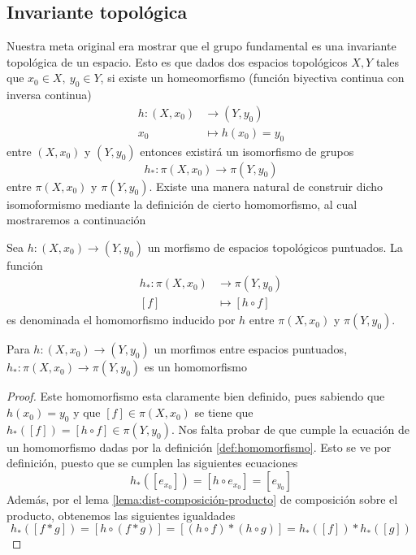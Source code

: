 {\subsection{Invariante topológica}
Nuestra meta original era mostrar que el grupo fundamental es una
invariante topológica de un espacio. Esto es que dados dos
espacios topológicos \(X,Y\) tales que \(x_0 \in X,\ y_0 \in Y\), si
existe un homeomorfismo (función biyectiva continua con inversa
continua)
\begin{align*}
  h : (X, x_0) &\longrightarrow (Y, y_0) \\
  x_0 &\longmapsto h(x_0) = y_0
\end{align*}
entre \((X, x_0)\) y \((Y, y_0)\) entonces existirá un isomorfismo de
grupos
\[ h_{*} : \pi (X, x_0) \longrightarrow \pi (Y, y_0) \]
entre \(\pi (X, x_0)\) y \(\pi (Y, y_0)\). Existe una manera natural de
construir dicho isomoformismo mediante la definición de cierto
homomorfismo, al cual mostraremos a continuación
\begin{definicion} \label{def:homomorfismo-inducido}
  Sea \(h : (X, x_0) \longrightarrow (Y, y_0)\) un morfismo de
  espacios topológicos puntuados. La función
  \begin{align*}
    h_* : \pi (X, x_0) &\longrightarrow \pi (Y, y_0) \\
    [f] &\longmapsto [h \circ f]
  \end{align*}
  es denominada el homomorfismo inducido por \(h\) entre \(\pi (X,
  x_0)\) y \(\pi (Y, y_0)\).
\end{definicion}
\begin{teorema} \label{thm:morfismo-homomorfismo}
  Para \(h : (X, x_0) \to (Y, y_0)\) un morfimos entre espacios
  puntuados, \(h_* : \pi (X, x_0) \to \pi (Y, y_0)\) es un homomorfismo
\end{teorema}
\begin{proof}
  Este homomorfismo esta claramente bien definido, pues sabiendo que \(h
  (x_0) = y_0\) y que \([f] \in \pi (X, x_0)\) se tiene que \(h_* ([f]) =
  [h \circ f] \in \pi (Y, y_0)\). Nos falta probar de que cumple la
  ecuación de un homomorfismo dadas por la definición
  \ref{def:homomorfismo}. Esto se ve por definición, puesto que se cumplen
  las siguientes ecuaciones
  \[ h_{*} ([e_{x_0}]) = [h \circ e_{x_0}] = [e_{y_0}]\]
  Además, por el lema \ref{lema:dist-composición-producto} de composición
  sobre el producto, obtenemos las siguientes igualdades
  \[ h_{*} ([f * g]) = [h \circ (f * g)] = [(h \circ f) * (h \circ g)]
    = h_{*} ([f]) * h_{*} ([g])\]

\end{proof}}
